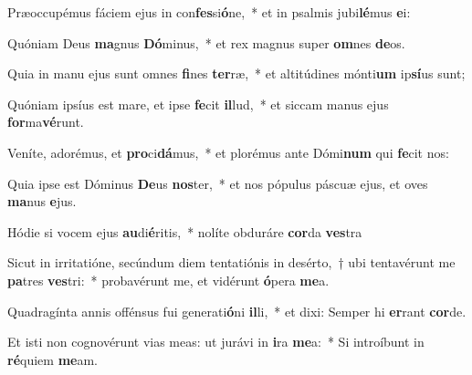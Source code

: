 \item Præoccupémus fáciem ejus in con\textbf{fes}si\textbf{ó}ne,~* et in psalmis jubi\textbf{lé}mus \textbf{e}i:
\item Quóniam Deus \textbf{ma}gnus \textbf{Dó}minus,~* et rex magnus super \textbf{om}nes \textbf{de}os.
\item Quia in manu ejus sunt omnes \textbf{fi}nes \textbf{ter}ræ,~* et altitúdines mónti\textbf{um} ip\textbf{sí}us sunt;
\item Quóniam ipsíus est mare, et ipse \textbf{fe}cit \textbf{il}lud,~* et siccam manus ejus \textbf{for}ma\textbf{vé}runt.
\item Veníte, adorémus, et \textbf{pro}ci\textbf{dá}mus,~* et plorémus ante Dómi\textbf{num} qui \textbf{fe}cit nos:
\item Quia ipse est Dóminus \textbf{De}us \textbf{nos}ter,~* et nos pópulus páscuæ ejus, et oves \textbf{ma}nus \textbf{e}jus.
\item Hódie si vocem ejus \textbf{au}di\textbf{é}ritis,~* nolíte obduráre \textbf{cor}da \textbf{ves}tra
\item Sicut in irritatióne, secúndum diem tentatiónis in desérto,~† ubi tentavérunt me \textbf{pa}tres \textbf{ves}tri:~* probavérunt me, et vidérunt \textbf{ó}pera \textbf{me}a.
\item Quadragínta annis offénsus fui generati\textbf{ó}ni \textbf{il}li,~* et dixi: Semper hi \textbf{er}rant \textbf{cor}de.
\item Et isti non cognovérunt vias meas: ut jurávi in \textbf{i}ra \textbf{me}a:~* Si introíbunt in \textbf{ré}quiem \textbf{me}am.
